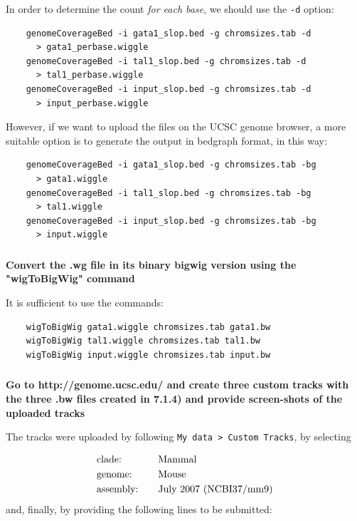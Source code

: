 \documentclass[12pt, a4paper]{article}
\begin{document}
	In order to determine the count \textit{for each base}, we should use the \verb|-d| option:
	
	\begin{verbatim}
	genomeCoverageBed -i gata1_slop.bed -g chromsizes.tab -d
	  > gata1_perbase.wiggle
	genomeCoverageBed -i tal1_slop.bed -g chromsizes.tab -d
	  > tal1_perbase.wiggle
	genomeCoverageBed -i input_slop.bed -g chromsizes.tab -d
	  > input_perbase.wiggle
	\end{verbatim}
	
	However, if we want to upload the files on the UCSC genome browser, a more suitable option is to generate the output in bedgraph format, in this way:
	
	\begin{verbatim}
	genomeCoverageBed -i gata1_slop.bed -g chromsizes.tab -bg
	  > gata1.wiggle
	genomeCoverageBed -i tal1_slop.bed -g chromsizes.tab -bg
	  > tal1.wiggle
	genomeCoverageBed -i input_slop.bed -g chromsizes.tab -bg
	  > input.wiggle
	\end{verbatim}
	
	\subsubsection{}
	\textbf{Convert the .wg file in its binary bigwig version using the "wigToBigWig" command}
	
	It is sufficient to use the commands:
	
	\begin{verbatim}
	wigToBigWig gata1.wiggle chromsizes.tab gata1.bw
	wigToBigWig tal1.wiggle chromsizes.tab tal1.bw
	wigToBigWig input.wiggle chromsizes.tab input.bw
	\end{verbatim}
	
	\subsubsection{}
	\textbf{Go to http://genome.ucsc.edu/ and create three custom tracks with the three .bw files created in 7.1.4) and provide screen-shots of the uploaded tracks}
	
	The tracks were uploaded by following \verb|My data > Custom Tracks|, by selecting
	
	\begin{alignat*}{2}
	& \text{clade:} && \text{Mammal}\\
	& \text{genome:} && \text{Mouse}\\
	& \text{assembly:\quad} && \text{July 2007 (NCBI37/mm9)}\\
	\end{alignat*}
	and, finally, by providing the following lines to be submitted:
	
\end{document}
